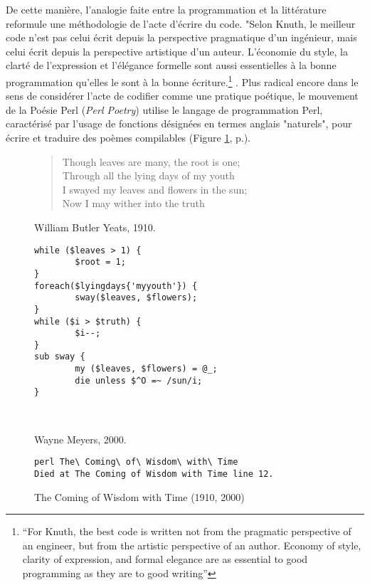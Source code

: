 De cette manière, l'analogie faite entre la programmation et la littérature reformule une méthodologie de l'acte d'écrire du code. "Selon Knuth, le meilleur code n'est pas celui écrit depuis la perspective pragmatique d'un ingénieur, mais celui écrit depuis la perspective artistique d'un auteur. L'économie du style, la clarté de l'expression et l'élégance formelle sont aussi essentielles à la bonne programmation qu'elles le sont à la bonne écriture.\footnote{“For Knuth, the best code is written not from the pragmatic perspective of an engineer, but from the artistic perspective of an author. Economy of style, clarity of expression, and formal elegance are as essential to good programming as they are to good writing”} \citep{Black2002}. Plus radical encore dans le sens de considérer l'acte de codifier comme une pratique poétique, le mouvement de la Poésie Perl (\emph{Perl Poetry}) utilise le langage de programmation Perl, caractérisé par l'usage de fonctions désignées en termes anglais "naturels", pour écrire et traduire des poèmes compilables (Figure \ref{fig2.1}, p.\pageref{fig2.1}).

\begin{figure}[htb]
\caption{The Coming of Wisdom with Time (1910, 2000)} \label{fig2.1}
\begin{multicols}{2}

\begin{verse}
Though leaves are many, the root is one;\\
Through all the lying days of my youth\\
I swayed my leaves and flowers in the sun;\\
Now I may wither into the truth\\
\end{verse}
\begin{flushright}
William Butler Yeats, 1910.
\end{flushright}

\columnbreak
{\scriptsize
\begin{verbatim}
while ($leaves > 1) {
        $root = 1;
}
foreach($lyingdays{'myyouth'}) {
        sway($leaves, $flowers);
}
while ($i > $truth) {
        $i--;
}
sub sway {
        my ($leaves, $flowers) = @_;
        die unless $^O =~ /sun/i;
}
\end{verbatim}
}\\
\begin{flushright}
Wayne Meyers, 2000.\\
\end{flushright}
{\scriptsize
\begin{verbatim}
perl The\ Coming\ of\ Wisdom\ with\ Time 
Died at The Coming of Wisdom with Time line 12.
\end{verbatim}
}
\end{multicols}
\end{figure}

